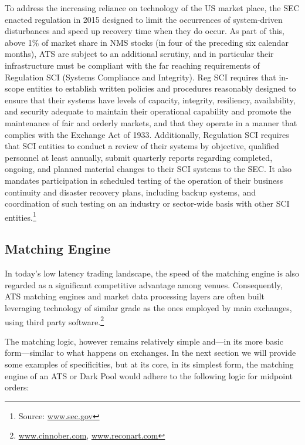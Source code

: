 To address the increasing reliance on technology of the US market place, the SEC enacted regulation in 2015 designed to limit the occurrences of system-driven disturbances and speed up recovery time when they do occur. As part of this, above 1\% of market share in NMS stocks (in four of the preceding six calendar months), ATS are subject to an additional scrutiny, and in particular their infrastructure must be compliant with the far reaching requirements of Regulation SCI (Systems Compliance and Integrity). Reg SCI requires that in-scope entities to establish written policies and procedures reasonably designed to ensure that their systems have levels of capacity, integrity, resiliency, availability, and security adequate to maintain their operational capability and promote the maintenance of fair and orderly markets, and that they operate in a manner that complies with the Exchange Act of 1933. Additionally, Regulation SCI requires that SCI entities to conduct a review of their systems by objective, qualified personnel at least annually, submit quarterly reports regarding completed, ongoing, and planned material changes to their SCI systems to the SEC. It also mandates participation in scheduled testing of the operation of their business continuity and disaster recovery plans, including backup systems, and coordination of such testing on an industry or sector-wide basis with other SCI entities.\footnote{Source: \url{www.sec.gov}}



\subsection{Matching Engine\label{sec:match_engine}}\label{in:matcheng1}

In today's low latency trading landscape, the speed of the matching engine is also regarded as a significant competitive advantage among venues. Consequently, ATS  matching engines and market data processing layers are often built leveraging technology of similar grade as the ones employed by main exchanges, using third party software.\footnote{\url{www.cinnober.com}, \url{www.reconart.com}}


The matching logic, however remains relatively simple and---in its more basic form---similar to what happens on exchanges. In the next section we will provide some examples of specificities, but at its core, in its simplest form, the matching engine of an ATS or Dark Pool would adhere to the following logic for midpoint orders: \twomedskip


